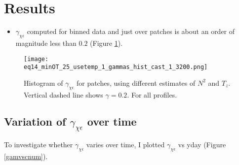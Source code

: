 \documentclass[11pt]{article}
\begin{document}
\section{Results}

\begin{itemize}
\item $\gamma_{\chi\epsilon}$ computed for binned data and just over patches is about an order of magnitude less than $0.2$ (Figure \ref{patchgam}).
\end{itemize}
%

%
%
%
\begin{figure}[htbp]
\texttt{[image: eq14\_minOT\_25\_usetemp\_1\_gammas\_hist\_cast\_1\_3200.png]}
\caption{Histogram of $\gamma_{\chi\epsilon}$ for patches, using different estimates of $N^2$ and $T_z$. Vertical dashed line shows $\gamma=0.2$. For all profiles.}
\label{patchgam}
\end{figure}


%
%




\clearpage
\subsection{Variation of $\gamma_{\chi\epsilon}$ over time}

To investigate whether $\gamma_{\chi\epsilon}$ varies over time, I plotted $\gamma_{\chi\epsilon}$ vs yday (Figure \ref{gamvscnum}).%
\end{document}
